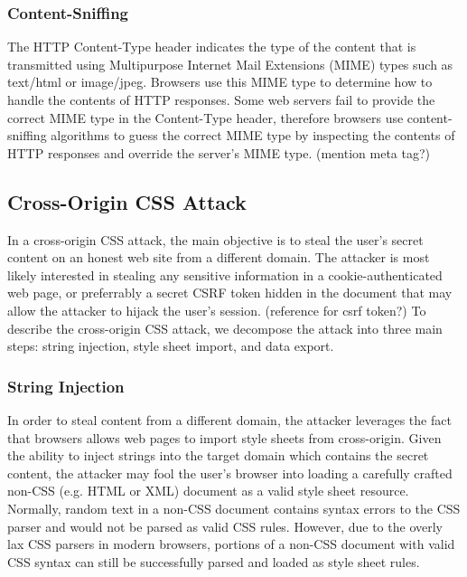 \documentclass{acm_proc_article-sp}
\begin{document}
\subsubsection{Content-Sniffing}
The HTTP Content-Type header indicates the type of the content that is transmitted using Multipurpose Internet Mail Extensions (MIME)\cite{mime} types such as text/html or image/jpeg. Browsers use this MIME type to determine how to handle the contents of HTTP responses. Some web servers fail to provide the correct MIME type in the Content-Type header, therefore browsers use content-sniffing algorithms to guess the correct MIME type by inspecting the contents of HTTP responses and override the server's MIME type.
(mention meta tag?)

\subsection{Cross-Origin CSS Attack}
In a cross-origin CSS attack, the main objective is to steal the user's secret content on an honest web site from a different domain. The attacker is most likely interested in stealing any sensitive information in a cookie-authenticated web page, or preferrably a secret CSRF token hidden in the document that may allow the attacker to hijack the user's session. 
(reference for csrf token?)
To describe the cross-origin CSS attack, we decompose the attack into three main steps: string injection, style sheet import, and data export.

\subsubsection{String Injection}
In order to steal content from a different domain, the attacker leverages the fact that browsers allows web pages to import style sheets from cross-origin. Given the ability to inject strings into the target domain which contains the secret content, the attacker may fool the user's browser into loading a carefully crafted non-CSS (e.g. HTML or XML) document as a valid style sheet resource. Normally, random text in a non-CSS document contains syntax errors to the CSS parser and would not be parsed as valid CSS rules. However, due to the overly lax CSS parsers in modern browsers, portions of a non-CSS document with valid CSS syntax can still be successfully parsed and loaded as style sheet rules.
\end{document}
